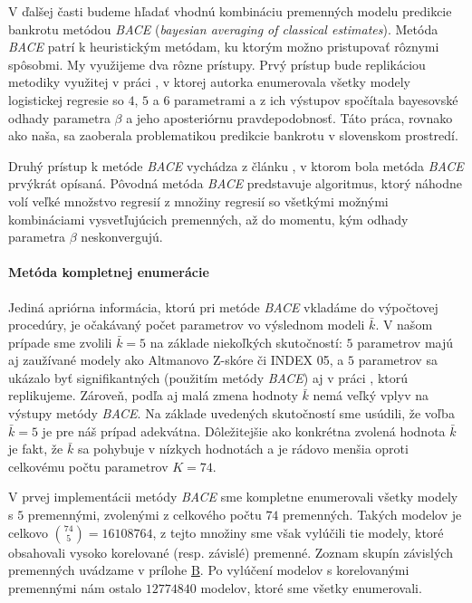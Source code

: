 V ďalšej časti budeme hľadať vhodnú kombináciu premenných modelu predikcie bankrotu metódou \emph{BACE} (\emph{bayesian averaging of classical estimates}).
Metóda \emph{BACE} patrí k heuristickým metódam, ku ktorým možno pristupovať rôznymi spôsobmi. My využijeme dva rôzne prístupy.
Prvý prístup bude replikáciou metodiky využitej v práci \cite{ondrusekova}, v ktorej autorka enumerovala všetky modely logistickej regresie so \(4\), \(5\) a \(6\) parametrami
a z ich výstupov spočítala bayesovské odhady parametra \(\beta\) a jeho aposteriórnu pravdepodobnosť.
Táto práca, rovnako ako naša, sa zaoberala problematikou predikcie bankrotu v slovenskom prostredí.

Druhý prístup k metóde \emph{BACE} vychádza z článku \cite{sala-i-martin}, v ktorom bola metóda \emph{BACE} prvýkrát opísaná.
Pôvodná metóda \emph{BACE} predstavuje algoritmus, ktorý náhodne volí veľké množstvo regresií z množiny regresií so všetkými možnými kombináciami vysvetľujúcich premenných,
až do momentu, kým odhady parametra \(\beta\) neskonvergujú.

\paragraph{Metóda kompletnej enumerácie}
\label{model_bace_1}

Jediná apriórna informácia, ktorú pri metóde \emph{BACE} vkladáme do výpočtovej procedúry, je očakávaný počet parametrov vo výslednom modeli \( \bar{k} \).
V našom prípade sme zvolili \( \bar{k} = 5 \) na základe niekoľkých skutočností: \(5\) parametrov majú aj zaužívané modely ako Altmanovo Z-skóre či INDEX 05,
a \(5\) parametrov sa ukázalo byť signifikantných (použitím metódy \emph{BACE}) aj v práci \cite{ondrusekova}, ktorú replikujeme.
Zároveň, podľa \cite{sala-i-martin} aj \cite{polaci} malá zmena hodnoty \( \bar{k} \) nemá veľký vplyv na výstupy metódy \emph{BACE}.
Na základe uvedených skutočností sme usúdili, že voľba \( \bar{k} = 5 \) je pre náš prípad adekvátna.
Dôležitejšie ako konkrétna zvolená hodnota \( \bar{k} \) je fakt, že \( \bar{k} \) sa pohybuje v nízkych hodnotách a je rádovo menšia oproti celkovému počtu parametrov \( K = 74 \).

V prvej implementácii metódy \emph{BACE} sme kompletne enumerovali všetky modely s \(5\) premennými, zvolenými z celkového počtu \(74\) premenných.
Takých modelov je celkovo \(\binom{74}{5} = 16108764\), z tejto množiny sme však vylúčili tie modely, ktoré obsahovali vysoko korelované (resp. závislé) premenné.
Zoznam skupín závislých premenných uvádzame v prílohe \hyperref[appendix:b]{B}. 
Po vylúčení modelov s korelovanými premennými nám ostalo \(12774840\) modelov, ktoré sme všetky enumerovali.

